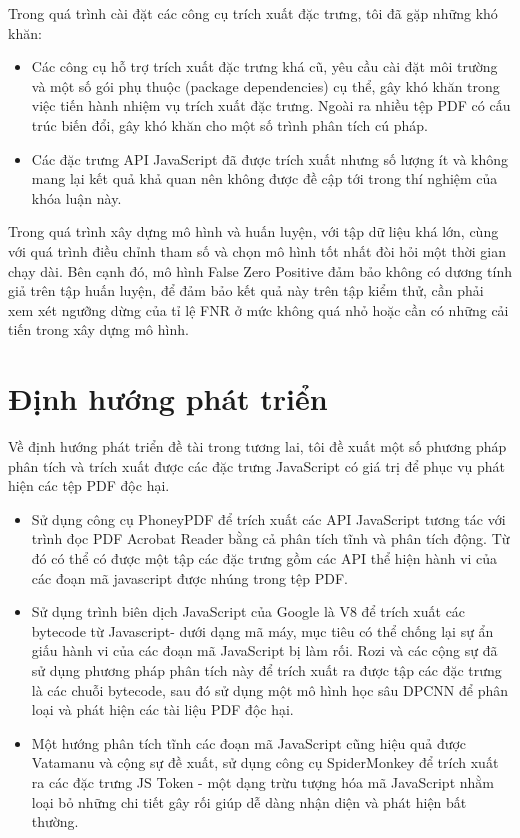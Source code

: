 \documentclass[./../main.tex]{subfiles}
\begin{document}
Trong quá trình cài đặt các công cụ trích xuất đặc trưng, tôi đã gặp những khó khăn:
\begin{itemize}
	\item
	      Các công cụ hỗ trợ trích xuất đặc trưng khá cũ, yêu cầu cài đặt môi trường và một số gói phụ thuộc (package dependencies) cụ thể, gây khó khăn trong việc tiến hành nhiệm vụ trích xuất đặc trưng. Ngoài ra nhiều tệp PDF có cấu trúc biến đổi, gây khó khăn cho một số trình phân tích cú pháp.
	\item
	      Các đặc trưng API JavaScript đã được trích xuất nhưng số lượng ít và không mang lại kết quả khả quan nên không được đề cập tới trong thí nghiệm của khóa luận này.

\end{itemize}
Trong quá trình xây dựng mô hình và huấn luyện, với tập dữ liệu khá lớn, cùng với quá trình điều chỉnh tham số và chọn mô hình tốt nhất đòi hỏi một thời gian chạy dài. Bên cạnh đó, mô hình False Zero Positive đảm bảo không có dương tính giả trên tập huấn luyện, để đảm bảo kết quả này trên tập kiểm thử, cần phải xem xét ngưỡng dừng của tỉ lệ FNR ở mức không quá nhỏ hoặc cần có những cải tiến trong xây dựng mô hình.

\section{Định hướng phát triển}

Về định hướng phát triển đề tài trong tương lai, tôi đề xuất một số phương pháp phân tích và trích xuất được các đặc trưng JavaScript có giá trị để phục vụ phát hiện các tệp PDF độc hại.
\begin{itemize}
	\item Sử dụng công cụ PhoneyPDF để trích xuất các API JavaScript tương tác với trình đọc PDF Acrobat Reader bằng cả phân tích tĩnh và phân tích động. Từ đó có thể có được một tập các đặc trưng gồm các API thể hiện hành vi của các đoạn mã javascript được nhúng trong tệp PDF.
	\item Sử dụng trình biên dịch JavaScript của Google là V8 để trích xuất các bytecode từ Javascript- dưới dạng mã máy, mục tiêu có thể chống lại sự ẩn giấu hành vi của các đoạn mã JavaScript bị làm rối. Rozi và các cộng sự \cite{bytecode} đã sử dụng phương pháp phân tích này để trích xuất ra được tập các đặc trưng là các chuỗi bytecode, sau đó sử dụng một mô hình học sâu DPCNN \cite{dpcnn} để phân loại và phát hiện các tài liệu PDF độc hại.
	\item Một hướng phân tích tĩnh các đoạn mã JavaScript cũng hiệu quả được Vatamanu và cộng sự \cite{vatamanu} đề xuất, sử dụng công cụ SpiderMonkey để trích xuất ra các đặc trưng JS Token - một dạng trừu tượng hóa mã JavaScript nhằm loại bỏ những chi tiết gây rối giúp dễ dàng nhận diện và phát hiện bất thường.
\end{itemize}
\end{document}
